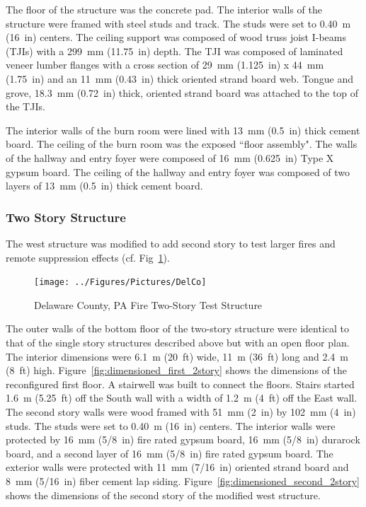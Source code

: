 \documentclass[12pt,oneside]{book}
\begin{document}
The floor of the structure was the concrete pad. The interior walls of the structure were framed with steel studs and track.  The studs were set to 0.40~m (16~in) centers. The ceiling support was composed of wood truss joist I-beams (TJIs) with a 299~mm (11.75~in) depth. The TJI was composed of laminated veneer lumber flanges with a cross section of 29~mm (1.125~in) x 44~mm (1.75~in) and an 11~mm (0.43~in) thick oriented strand board web. Tongue and grove, 18.3~mm (0.72~in) thick, oriented strand board was attached to the top of the TJIs.

The interior walls of the burn room were lined with 13~mm (0.5~in) thick cement board. The ceiling of the burn room was the exposed ``floor assembly". The walls of the hallway and entry foyer were composed of 16~mm (0.625~in) Type X gypsum board. The ceiling of the hallway and entry foyer was composed of two layers of 13~mm (0.5~in) thick cement board.

\subsubsection*{Two Story Structure}

The west structure was modified to add second story to test larger fires and remote suppression effects (cf. Fig~\ref{fig:delco_2story}).

\begin{figure}[!ht]
	\texttt{[image: ../Figures/Pictures/DelCo]}
	\caption{Delaware County, PA Fire Two-Story Test Structure}
	\label{fig:delco_2story}
\end{figure}

The outer walls of the bottom floor of the two-story structure were identical to that of the single story structures described above but with an open floor plan. The interior dimensions were 6.1~m (20~ft) wide, 11~m (36~ft) long and 2.4~m (8~ft) high. Figure~\ref{fig:dimensioned_first_2story} shows the dimensions of the reconfigured first floor. A stairwell was built to connect the floors. Stairs started 1.6~m (5.25~ft) off the South wall with a width of 1.2~m (4~ft) off the East wall. The second story walls were wood framed with 51~mm (2~in) by 102~mm (4~in) studs. The studs were set to 0.40~m (16~in) centers. The interior  walls were protected by 16~mm (5/8~in) fire rated gypsum board, 16~mm (5/8~in) durarock board, and a second layer of 16~mm (5/8~in) fire rated gypsum board. The exterior walls were protected with 11~mm (7/16~in) oriented strand board and 8~mm (5/16~in) fiber cement lap siding. Figure~\ref{fig:dimensioned_second_2story} shows the dimensions of the second story of the modified west structure.
\end{document}
